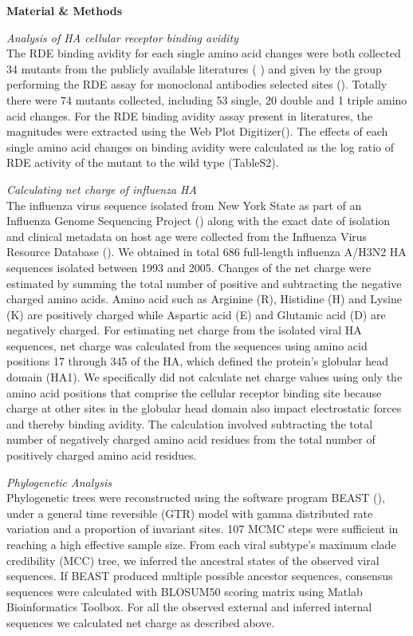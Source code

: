 \documentclass[12pt,a4paper]{article}
\begin{document}


{\bf Material \& Methods}

\textit{Analysis of HA cellular receptor binding avidity} \\
The RDE binding avidity for each single amino acid changes were both collected 34 mutants from the publicly available literatures (\cite{Hensley2009} \cite{Das2011} \cite{Myers2013} \cite{Li}) and given by the group performing the RDE assay for monoclonal antibodies selected sites (\cite{Hensley2009}). Totally there were 74 mutants collected, including 53 single, 20 double and 1 triple amino acid changes. For the RDE binding avidity assay present in literatures, the magnitudes were extracted using the Web Plot Digitizer(\cite{Rohatgi2012}). The effects of each single amino acid changes on binding avidity were calculated as the log ratio of RDE activity of the mutant to the wild type (TableS2).

\textit{Calculating net charge of influenza HA} \\
The influenza virus sequence isolated from New York State as part of an Influenza Genome Sequencing Project (\cite{Ghedin2005}) along with the exact date of isolation and clinical metadata on host age were collected from the Influenza Virus Resource Database (\cite{Bao2008}). We obtained in total 686 full-length influenza A/H3N2 HA sequences isolated between 1993 and 2005. Changes of the net charge were estimated by summing the total number of positive and subtracting the negative  charged amino acids. Amino acid such as Arginine (R), Histidine (H) and Lysine (K) are positively charged while Aspartic acid (E) and Glutamic acid (D) are negatively charged. For estimating net charge from the isolated viral HA sequences, net charge was calculated from the sequences using amino acid positions 17 through 345 of the HA, which defined the protein’s globular head domain (HA1). We specifically did not calculate net charge values using only the amino acid positions that comprise the cellular receptor binding site because charge at other sites in the globular head domain also impact electrostatic forces and thereby binding avidity. The calculation involved subtracting the total number of negatively charged amino acid residues from the total number of positively charged amino acid residues.

\textit{Phylogenetic Analysis} \\
Phylogenetic trees were reconstructed using the software program BEAST (\cite{Drummond2012}), under a general time reversible (GTR) model with gamma distributed rate variation and a proportion of invariant sites. 107 MCMC steps were sufficient in reaching a high effective sample size. From each viral subtype’s maximum clade credibility (MCC) tree, we inferred the ancestral states of the observed viral sequences. If BEAST produced multiple possible ancestor sequences, consensus sequences were calculated with BLOSUM50 scoring matrix using Matlab Bioinformatics Toolbox. For all the observed external and inferred internal sequences we calculated net charge as described above.
\end{document}

